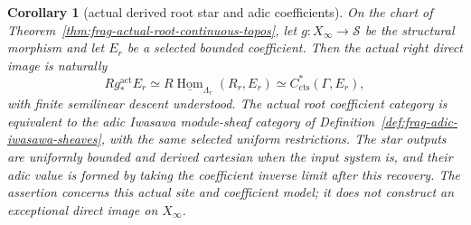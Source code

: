 \documentclass[11pt]{article}
\newtheorem{corollary}[theorem]{Corollary}
\theoremstyle{definition}
\theoremstyle{remark}
\begin{document}
\begin{corollary}[actual derived root star and adic coefficients]
\label{cor:frag-actual-root-derived-realization}
On the chart of Theorem~\ref{thm:frag-actual-root-continuous-topos}, let
$g:X_\infty\to\mathscr S$ be the structural morphism and let $E_r$
be a selected bounded coefficient.  Then the actual right direct
image is naturally
\[
Rg_*^{\mathrm{act}}E_r
 \simeq R\underline{\operatorname{Hom}}_{\Lambda_r}(R_r,E_r)
 \simeq C^*_{\mathrm{cts}}(\Gamma,E_r),
\]
with finite semilinear descent understood.  The actual root coefficient
category is equivalent to the adic Iwasawa module-sheaf category of
Definition~\ref{def:frag-adic-iwasawa-sheaves}, with the same selected
uniform restrictions.  The star outputs are uniformly bounded and
derived cartesian when the input system is, and their adic value is
formed by taking the coefficient inverse limit after this recovery.
The assertion concerns this actual site and coefficient model;
it does not construct an exceptional direct image on $X_\infty$.
\end{corollary}
\end{document}
